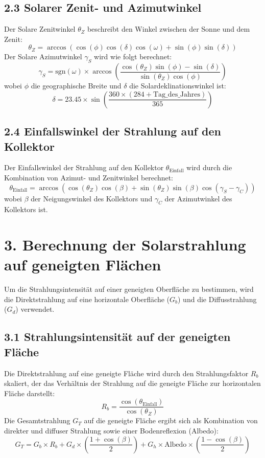 \documentclass{article}
\begin{document}
\subsection*{2.3 Solarer Zenit- und Azimutwinkel}
Der Solare Zenitwinkel \( \theta_Z \) beschreibt den Winkel zwischen der Sonne und dem Zenit:
\[
\theta_Z = \arccos\left( \cos(\phi) \cos(\delta) \cos(\omega) + \sin(\phi) \sin(\delta) \right)
\]
Der Solare Azimutwinkel \( \gamma_S \) wird wie folgt berechnet:
\[
\gamma_S = \text{sgn}(\omega) \times \arccos\left( \frac{\cos(\theta_Z) \sin(\phi) - \sin(\delta)}{\sin(\theta_Z) \cos(\phi)} \right)
\]
wobei \( \phi \) die geographische Breite und \( \delta \) die Solardeklinationswinkel ist:
\[
\delta = 23.45 \times \sin\left( \frac{360 \times (284 + \text{Tag\_des\_Jahres})}{365} \right)
\]

\subsection*{2.4 Einfallswinkel der Strahlung auf den Kollektor}
Der Einfallswinkel der Strahlung auf den Kollektor \( \theta_{\text{Einfall}} \) wird durch die Kombination von Azimut- und Zenitwinkel berechnet:
\[
\theta_{\text{Einfall}} = \arccos\left( \cos(\theta_Z) \cos(\beta) + \sin(\theta_Z) \sin(\beta) \cos(\gamma_S - \gamma_C) \right)
\]
wobei \( \beta \) der Neigungswinkel des Kollektors und \( \gamma_C \) der Azimutwinkel des Kollektors ist.

\section*{3. Berechnung der Solarstrahlung auf geneigten Flächen}
Um die Strahlungsintensität auf einer geneigten Oberfläche zu bestimmen, wird die Direktstrahlung auf eine horizontale Oberfläche (\( G_b \)) und die Diffusstrahlung (\( G_d \)) verwendet.

\subsection*{3.1 Strahlungsintensität auf der geneigten Fläche}
Die Direktstrahlung auf eine geneigte Fläche wird durch den Strahlungsfaktor \( R_b \) skaliert, der das Verhältnis der Strahlung auf die geneigte Fläche zur horizontalen Fläche darstellt:
\[
R_b = \frac{\cos(\theta_{\text{Einfall}})}{\cos(\theta_Z)}
\]
Die Gesamtstrahlung \( G_T \) auf die geneigte Fläche ergibt sich als Kombination von direkter und diffuser Strahlung sowie einer Bodenreflexion (Albedo):
\[
G_T = G_b \times R_b + G_d \times \left( \frac{1 + \cos(\beta)}{2} \right) + G_h \times \text{Albedo} \times \left( \frac{1 - \cos(\beta)}{2} \right)
\]
\end{document}
